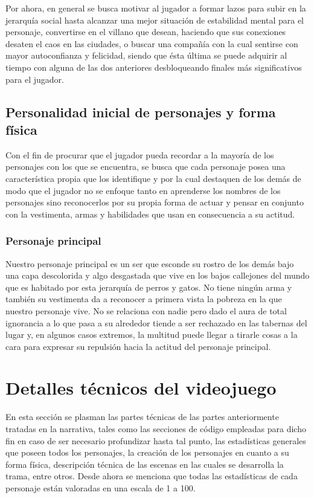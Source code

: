 \documentclass{article}
\begin{document}
Por ahora, en general se busca motivar al jugador a formar lazos para subir en la jerarquía social hasta alcanzar una mejor situación de estabilidad mental para el personaje, convertirse en el villano que desean, haciendo que sus conexiones desaten el caos en las ciudades, o buscar una compañía con la cual sentirse con mayor autoconfianza y felicidad, siendo que ésta última se puede adquirir al tiempo con alguna de las dos anteriores desbloqueando finales más significativos para el jugador.
\subsection{Personalidad inicial de personajes y forma física}
Con el fin de procurar que el jugador pueda recordar a la mayoría de los personajes con los que se encuentra, se busca que cada personaje posea una característica propia que los identifique y por la cual destaquen de los demás de modo que el jugador no se enfoque tanto en aprenderse los nombres de los personajes sino reconocerlos por su propia forma de actuar y pensar en conjunto con la vestimenta, armas y habilidades que usan en consecuencia a su actitud.
\subsubsection{Personaje principal}
Nuestro personaje principal es un ser que esconde su rostro de los demás bajo una capa descolorida y algo desgastada que vive en los bajos callejones del mundo que es habitado por esta jerarquía de perros y gatos. No tiene ningún arma y también su vestimenta da a reconocer a primera vista la pobreza en la que nuestro personaje vive. No se relaciona con nadie pero dado el aura de total ignorancia a lo que pasa a su alrededor tiende a ser rechazado en las tabernas del lugar y, en algunos casos extremos, la multitud puede llegar a tirarle cosas a la cara para expresar su repulsión hacia la actitud del personaje principal. 
\section{Detalles técnicos del videojuego} \label{technical_part}
En esta sección se plasman las partes técnicas de las partes anteriormente tratadas en la narrativa, tales como las secciones de código empleadas para dicho fin en caso de ser necesario profundizar hasta tal punto, las estadísticas generales que poseen todos los personajes, la creación de los personajes en cuanto a su forma física, descripción técnica de las escenas en las cuales se desarrolla la trama, entre otros. Desde ahora se menciona que todas las estadísticas de cada personaje están valoradas en una escala de 1 a 100.
\end{document}
